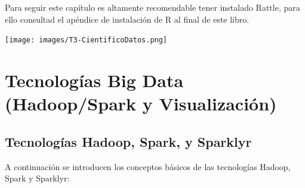 \documentclass[
]{book}
\begin{document}
Para seguir este capítulo es altamente recomendable tener instalado Rattle, para ello consultad el apéndice de instalación de R al final de este libro.

\texttt{[image: images/T3-CientificoDatos.png]}

\section{Tecnologías Big Data (Hadoop/Spark y Visualización)}\label{tecnologuxedas-big-data-hadoopspark-y-visualizaciuxf3n}

\subsection{Tecnologías Hadoop, Spark, y Sparklyr}\label{tecnologuxedas-hadoop-spark-y-sparklyr}

A continuación se introducen los conceptos básicos de las tecnologías Hadoop, Spark y Sparklyr:
\end{document}

